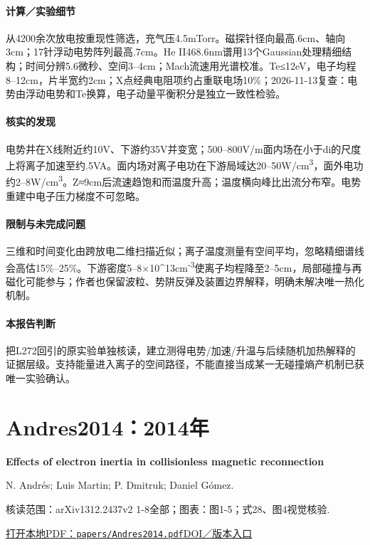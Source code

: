 \documentclass[UTF8,a4paper,11pt,openany,fontset=fandol]{ctexbook}
\begin{document}
\paragraph{计算／实验细节}从4200余次放电按重现性筛选，充气压4.5mTorr。磁探针径向最高.6cm、轴向3cm；17针浮动电势阵列最高.7cm。He II468.6nm谱用13个Gaussian处理精细结构；时间分辨5.6微秒、空间3–4cm；Mach流速用光谱校准。Te≤12eV，电子均程8–12cm，片半宽约2cm；X点经典电阻项约占重联电场10\%；2026-11-13复查：电势由浮动电势和Te换算，电子动量平衡积分是独立一致性检验。

\paragraph{核实的发现}电势井在X线附近约10V、下游约35V并变宽；500–800V/m面内场在小于di的尺度上将离子加速至约.5VA。面内场对离子电功在下游局域达20–50W/cm\textsuperscript{3}，面外电功约2–8W/cm\textsuperscript{3}。Z≈9cm后流速趋饱和而温度升高；温度横向峰比出流分布窄。电势重建中电子压力梯度不可忽略。

\paragraph{限制与未完成问题}三维和时间变化由跨放电二维扫描近似；离子温度测量有空间平均，忽略精细谱线会高估15\%–25\%。下游密度5–8×10\textasciicircum{}13cm\textsuperscript{-3}使离子均程降至2–5cm，局部碰撞与再磁化可能参与；作者也保留波粒、势阱反弹及装置边界解释，明确未解决唯一热化机制。

\paragraph{本报告判断}把L272回引的原实验单独核读，建立测得电势/加速/升温与后续随机加热解释的证据层级。支持能量进入离子的空间路径，不能直接当成某一无碰撞熵产机制已获唯一实验确认。

\section{Andres2014：2014年}\label{paper:Andres2014}

\textbf{Effects of electron inertia in collisionless magnetic reconnection}\citep{Andres2014}\

N. Andrés;  Luis Martin;  P. Dmitruk;  Daniel Gómez.

\textsf{核读范围：}arXiv1312.2437v2 1-8全部；\textsf{图表：}图1-5；式28、图4视觉核验.

\href{run:../papers/Andres2014.pdf}{打开本地PDF：\texttt{papers/Andres2014.pdf}}\quad\href{https://doi.org/10.1063/1.4890021}{DOI／版本入口}
\end{document}
